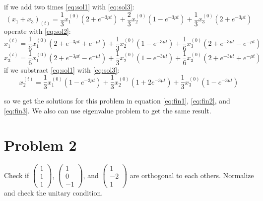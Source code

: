 \documentclass[paper=a4, fontsize=11pt]{scrartcl}
\numberwithin{equation}{section} %
\numberwithin{figure}{section} %
\numberwithin{table}{section} %
\begin{document}
if we add two times \eqref{eq:sol1} with \eqref{eq:sol3}:
\begin{equation}
(x_1 + x_3)_{(t)} = \frac{1}{3} x_1^{(0)} ( 2 + e^{-3\mu t}) + \frac{2}{3} x_2^{(0)} ( 1 - e^{-3\mu t}) + \frac{1}{3} x_3^{(0)} (2 + e^{-3\mu t})
\end{equation}
operate with \eqref{eq:sol2}:
\begin{equation}
\label{eq:fin1}
x_1^{(t)} = \frac{1}{6} x_1^{(0)} ( 2 + e^{-3\mu t} + e^{-\mu t}) + \frac{1}{3} x_2^{(0)} ( 1 - e^{-3\mu t}) + \frac{1}{6} x_3^{(0)} ( 2 + e^{-3\mu t} - e^{-\mu t})
\end{equation}
\begin{equation}
\label{eq:fin2}
x_3^{(t)} = \frac{1}{6} x_1^{(0)} ( 2 + e^{-3\mu t} - e^{-\mu t}) + \frac{1}{3} x_2^{(0)} ( 1 - e^{-3\mu t}) + \frac{1}{6} x_3^{(0)} ( 2 + e^{-3\mu t} + e^{-\mu t})
\end{equation}
if we substract \eqref{eq:sol1} with \eqref{eq:sol3}:
\begin{equation}
\label{eq:fin3}
x_2^{(t)} = \frac{1}{3} x_1^{(0)} ( 1 - e^{-3\mu t}) + \frac{1}{3} x_2^{(0)} ( 1 + 2e^{-3\mu t}) + \frac{1}{3} x_3^{(0)} ( 1 - e^{-3\mu t})
\end{equation}

so we get the solutions for this problem in equation \eqref{eq:fin1}, \eqref{eq:fin2}, and \eqref{eq:fin3}. We also can use eigenvalue problem to get the same result.


\newpage
\section{Problem 2}
Check if $\begin{pmatrix} 1 \\ 1 \\ 1\end{pmatrix}$, $\begin{pmatrix} 1 \\ 0 \\ -1\end{pmatrix}$, and $\begin{pmatrix} 1 \\ -2 \\ 1\end{pmatrix}$ are orthogonal to each others. Normalize and check the unitary condition.\\
\end{document}
